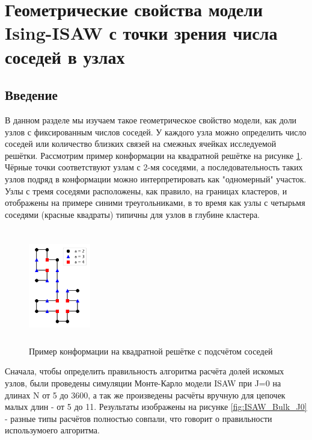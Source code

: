 \section{Геометрические свойства модели Ising-ISAW с точки зрения числа соседей в узлах}

\subsection{Введение}

В данном разделе мы изучаем такое геометрическое свойство модели, как доли узлов с фиксированным числов соседей. У каждого узла можно определить число соседей или количество близких связей на смежных ячейках исследуемой решётки. Рассмотрим пример конформации на квадратной решётке на рисунке \ref{fig:example_bulk}. Чёрные точки соответствуют узлам с 2-мя соседями, а последовательность таких узлов подряд в конформации можно интерпретировать как "одномерный" участок. Узлы с тремя соседями расположены, как правило, на границах кластеров, и отображены на примере синими треугольниками, в то время как узлы с четырьмя соседями (красные квадраты) типичны для узлов в глубине кластера.

\begin{figure}
    \centering
    \includegraphics[width=0.24\textwidth, height=5cm]{Sections/Images/update.png}
    \caption{Пример конформации на квадратной решётке с подсчётом соседей}
    \label{fig:example_bulk}
\end{figure}


Сначала, чтобы определить правильность алгоритма расчёта долей искомых узлов, были проведены симуляции Монте-Карло модели ISAW при J=0 на длинах N от 5 до 3600, а так же произведены расчёты вручную для цепочек малых длин - от 5 до 11. Результаты изображены на рисунке \ref{fig:ISAW_Bulk_J0} - разные типы расчётов полностью совпали, что говорит о правильности использумоего алгоритма.

